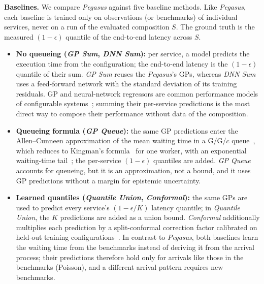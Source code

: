 \vspace{3pt}
\noindent
\textbf{Baselines.}
%
We compare \textit{Pegasus} against five baseline methods. Like \textit{Pegasus}, each baseline is trained only on observations (or benchmarks) of individual services, never on a run of the evaluated composition $S$. The ground truth is the measured $(1-\epsilon)$ quantile of the end-to-end latency across $S$.
%
\begin{itemize}
    \item \textbf{No queueing (\textit{GP Sum}, \textit{DNN Sum}):} per service, a model predicts the
    execution time from the configuration; the end-to-end latency is the $(1-\epsilon)$ quantile of their sum.
    \textit{GP Sum} reuses the \textit{Pegasus}'s GPs, whereas \textit{DNN Sum} uses a feed-forward network with the standard deviation of its training residuals.
    GP and neural-network regressors are common performance models of configurable systems~\cite{alipourfard_cherrypick_2017, van_aken_automatic_2017, li_metis_2018, fu_use_2021,liang_modular_2023}; summing their per-service predictions is the most direct way to compose their performance without data of the composition.

    \item \textbf{Queueing formula (\textit{GP Queue}):} the same GP predictions enter the Allen--Cunneen approximation of the mean waiting time in a G/G/$c$ queue~\cite{allen_probability_1990}, which reduces to Kingman's formula~\cite{kingman_single_1961} for one worker, with an exponential waiting-time tail~\cite{harchol2013performance}; the per-service $(1-\epsilon)$ quantiles are added. \textit{GP Queue} accounts for queueing, but it is an approximation, not a bound, and it uses GP predictions without a margin for epistemic uncertainty.

    \item \textbf{Learned quantiles (\textit{Quantile Union}, \textit{Conformal}):}
    the same GPs are used to predict every service's $(1-\epsilon/K)$ latency quantile;
    in \textit{Quantile Union}, the $K$ predictions are added as a union bound. \textit{Conformal} additionally multiplies each prediction by a split-conformal correction factor calibrated on held-out training configurations~\cite{vovk_conformal_2020}. In contrast to \textit{Pegasus}, both baselines learn the waiting time from the benchmarks instead of deriving it from the arrival process; their predictions therefore hold only for arrivals like those in the benchmarks (Poisson), and a different arrival pattern requires new benchmarks.
\end{itemize}

